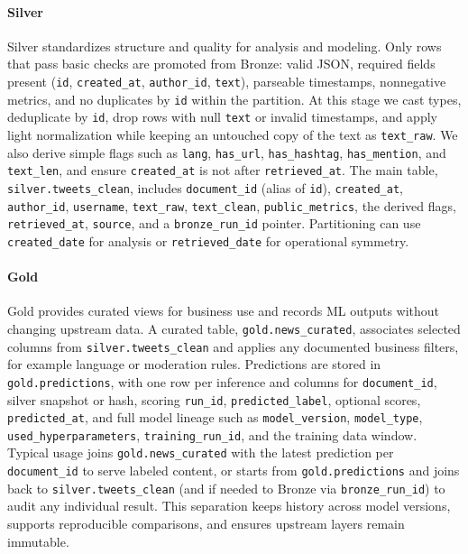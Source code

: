 \paragraph{Silver}
Silver standardizes structure and quality for analysis and modeling. Only rows that pass basic checks are promoted from Bronze: valid JSON, required fields present (\texttt{id}, \texttt{created\_at}, \texttt{author\_id}, \texttt{text}), parseable timestamps, nonnegative metrics, and no duplicates by \texttt{id} within the partition. At this stage we cast types, deduplicate by \texttt{id}, drop rows with null \texttt{text} or invalid timestamps, and apply light normalization while keeping an untouched copy of the text as \texttt{text\_raw}. We also derive simple flags such as \texttt{lang}, \texttt{has\_url}, \texttt{has\_hashtag}, \texttt{has\_mention}, and \texttt{text\_len}, and ensure \texttt{created\_at} is not after \texttt{retrieved\_at}. The main table, \texttt{silver.tweets\_clean}, includes \texttt{document\_id} (alias of \texttt{id}), \texttt{created\_at}, \texttt{author\_id}, \texttt{username}, \texttt{text\_raw}, \texttt{text\_clean}, \texttt{public\_metrics}, the derived flags, \texttt{retrieved\_at}, \texttt{source}, and a \texttt{bronze\_run\_id} pointer. Partitioning can use \texttt{created\_date} for analysis or \texttt{retrieved\_date} for operational symmetry.
\paragraph{Gold}
Gold provides curated views for business use and records ML outputs without changing upstream data. A curated table, \texttt{gold.news\_curated}, associates selected columns from \texttt{silver.tweets\_clean} and applies any documented business filters, for example language or moderation rules. Predictions are stored in \texttt{gold.predictions}, with one row per inference and columns for \texttt{document\_id}, silver snapshot or hash, scoring \texttt{run\_id}, \texttt{predicted\_label}, optional scores, \texttt{predicted\_at}, and full model lineage such as \texttt{model\_version}, \texttt{model\_type}, \texttt{used\_hyperparameters}, \texttt{training\_run\_id}, and the training data window. Typical usage joins \texttt{gold.news\_curated} with the latest prediction per \texttt{document\_id} to serve labeled content, or starts from \texttt{gold.predictions} and joins back to \texttt{silver.tweets\_clean} (and if needed to Bronze via \texttt{bronze\_run\_id}) to audit any individual result. This separation keeps history across model versions, supports reproducible comparisons, and ensures upstream layers remain immutable.

